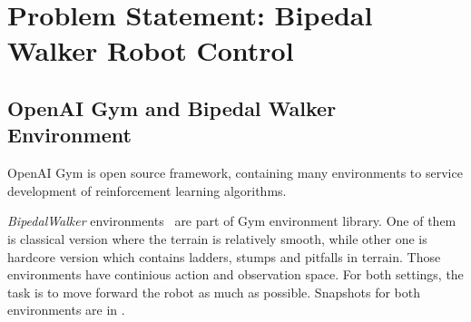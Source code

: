 \section{Problem Statement: Bipedal Walker Robot Control}
\label{sec:problem_statement}

\subsection{OpenAI Gym and Bipedal Walker Environment}
\label{ssec:gym_bipedal}

OpenAI Gym \cite{brockman_openai_2016} is open source framework, 
containing many environments to service development of 
reinforcement learning algorithms. 

\textit{BipedalWalker} environments~\cite{noauthor_bipedalwalker-v2_2021, noauthor_bipedalwalkerhardcore-v2_2021} are part of Gym environment library. 
One of them is classical version where the terrain is relatively smooth, while other one is hardcore version which contains ladders, stumps and pitfalls in terrain. 
Those environments have continious action and observation space. 
For both settings, the task is to move forward the robot as much as possible. 
Snapshots for both environments are in .
